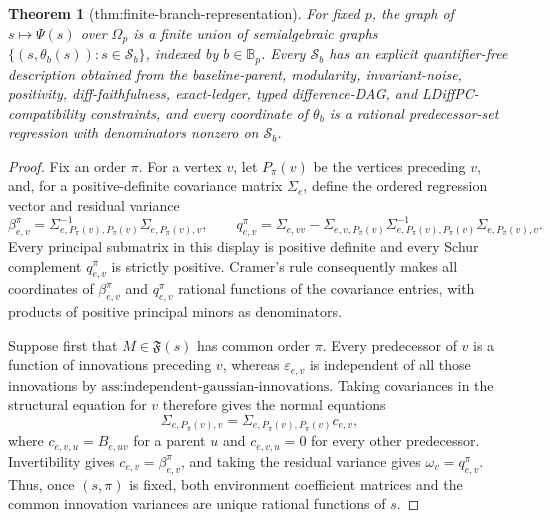 \documentclass{article}
\newtheorem{theorem}{Theorem}
\begin{document}
\begin{theorem}[thm:finite-branch-representation]\label{thm:finite-branch-representation}
For fixed \(p\), the graph of \(s\mapsto\Psi(s)\) over \(\Omega_p\) is a finite union of semialgebraic graphs \(\{(s,\theta_b(s)):s\in\mathcal S_b\}\), indexed by \(b\in\mathbb B_p\). Every \(\mathcal S_b\) has an explicit quantifier-free description obtained from the baseline-parent, modularity, invariant-noise, positivity, diff-faithfulness, exact-ledger, typed difference-DAG, and LDiffPC-compatibility constraints, and every coordinate of \(\theta_b\) is a rational predecessor-set regression with denominators nonzero on \(\mathcal S_b\).
\end{theorem}
\begin{proof}
Fix an order \(\pi\).  For a vertex \(v\), let \(P_\pi(v)\) be the vertices preceding \(v\), and, for a positive-definite covariance matrix \(\Sigma_e\), define the ordered regression vector and residual variance
\[
 \beta_{e,v}^{\pi}
   =\Sigma_{e,P_\pi(v),P_\pi(v)}^{-1}
      \Sigma_{e,P_\pi(v),v},\qquad
 q_{e,v}^{\pi}
   =\Sigma_{e,vv}-\Sigma_{e,v,P_\pi(v)}
      \Sigma_{e,P_\pi(v),P_\pi(v)}^{-1}
      \Sigma_{e,P_\pi(v),v}.
\]
Every principal submatrix in this display is positive definite and every Schur complement \(q_{e,v}^{\pi}\) is strictly positive.  Cramer's rule consequently makes all coordinates of \(\beta_{e,v}^{\pi}\) and \(q_{e,v}^{\pi}\) rational functions of the covariance entries, with products of positive principal minors as denominators.

Suppose first that \(M\in\mathfrak F(s)\) has common order \(\pi\).  Every predecessor of \(v\) is a function of innovations preceding \(v\), whereas \(\varepsilon_{e,v}\) is independent of all those innovations by \(\text{ass:independent-gaussian-innovations}\).  Taking covariances in the structural equation for \(v\) therefore gives the normal equations
\[
 \Sigma_{e,P_\pi(v),v}
 =\Sigma_{e,P_\pi(v),P_\pi(v)}c_{e,v},
\]
where \(c_{e,v,u}=B_{e,uv}\) for a parent \(u\) and \(c_{e,v,u}=0\) for every other predecessor.  Invertibility gives \(c_{e,v}=\beta_{e,v}^{\pi}\), and taking the residual variance gives \(\omega_v=q_{e,v}^{\pi}\).  Thus, once \((s,\pi)\) is fixed, both environment coefficient matrices and the common innovation variances are unique rational functions of \(s\).


\end{proof}
\end{document}
